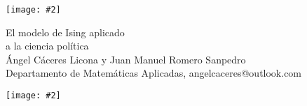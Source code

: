 \documentclass[portrait, a0b,final]{a0poster}%
\numberwithin{equation}{section}
\newenvironment{poster}{
  \begin{center}
  \begin{minipage}[c]{0.98\textwidth}
}{
  \end{minipage}
  \end{center}
}
\newenvironment{pcolumn}[1]{
  \begin{minipage}{#1\textwidth}
  \begin{center}
}{
  \end{center}
  \end{minipage}
}
\newcommand{\myfig}[3][0]{
\begin{center}
  \vspace{1.5cm}
  \texttt{[image: \#2]}
  \nobreak\medskip
\end{center}}
\newcommand{\mycaption}[1]{
  \vspace{0.5cm}
  \begin{quote}
    {{\sc Figura} \arabic{figure}: #1}
  \end{quote}
  \vspace{1cm}
  \stepcounter{figure}
}
\begin{document}
\begin{poster}
\begin{center}
\begin{pcolumn}{0.98}
{%
\begin{minipage}[c][9.5cm][t]{0.3\textwidth}                                  %
  \begin{flushleft}
        \begin{center}
           \myfig{logoUAMC.eps}{0.6} 
        \end{center}
  \end{flushleft}
\end{minipage}
\begin{minipage}[t][9.5cm][t]{0.40\textwidth}                                 %
  \begin{center}
    {\sc \Huge El modelo de Ising aplicado }\\[4mm]
    {\sc \Huge a la ciencia pol\'itica}\\[4mm]
    {\Large \'Angel C\'aceres Licona y Juan Manuel Romero Sanpedro} \\
    {\large Departamento de Matem\'aticas Aplicadas, angelcaceres@outlook.com} \\%
  \end{center}
\end{minipage}
\begin{minipage}[c][9.5cm][t]{0.30\textwidth}                                 %
    \begin{flushright}
    \myfig{Simposio.eps}{0.8}
  \end{flushright}
\end{minipage}


}
\end{pcolumn}
\end{center}
\end{poster}
\end{document}
